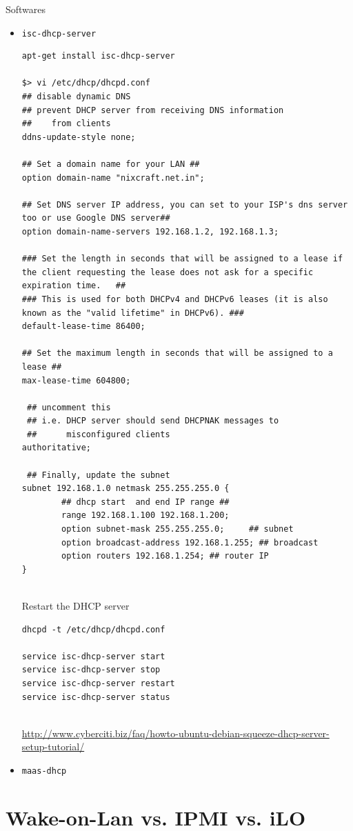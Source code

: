 Softwares
\begin{itemize}
  \item \verb!isc-dhcp-server!
\begin{verbatim}
apt-get install isc-dhcp-server

$> vi /etc/dhcp/dhcpd.conf
## disable dynamic DNS
## prevent DHCP server from receiving DNS information
##    from clients
ddns-update-style none;

## Set a domain name for your LAN ##
option domain-name "nixcraft.net.in";
 
## Set DNS server IP address, you can set to your ISP's dns server too or use Google DNS server##
option domain-name-servers 192.168.1.2, 192.168.1.3;

### Set the length in seconds that will be assigned to a lease if the client requesting the lease does not ask for a specific  expiration time.   ##
### This is used for both DHCPv4 and DHCPv6 leases (it is also known as the "valid lifetime" in DHCPv6). ###
default-lease-time 86400;
 
## Set the maximum length in seconds that will be assigned to a lease ##
max-lease-time 604800;
 
 ## uncomment this
 ## i.e. DHCP server should send DHCPNAK messages to
 ##      misconfigured clients 
authoritative;

 ## Finally, update the subnet
subnet 192.168.1.0 netmask 255.255.255.0 {
        ## dhcp start  and end IP range ##
        range 192.168.1.100 192.168.1.200;
        option subnet-mask 255.255.255.0;     ## subnet 
        option broadcast-address 192.168.1.255; ## broadcast
        option routers 192.168.1.254; ## router IP
} 
  
\end{verbatim}

Restart the DHCP server
\begin{verbatim}
dhcpd -t /etc/dhcp/dhcpd.conf

service isc-dhcp-server start
service isc-dhcp-server stop
service isc-dhcp-server restart
service isc-dhcp-server status
 
\end{verbatim}
  \url{http://www.cyberciti.biz/faq/howto-ubuntu-debian-squeeze-dhcp-server-setup-tutorial/}
  
  \item \verb!maas-dhcp!
\end{itemize}


\section{Wake-on-Lan vs. IPMI vs. iLO}
\label{sec:power-remotely}

